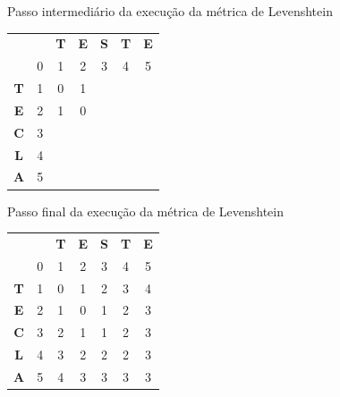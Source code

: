 \begin{quadro}[h!]
\caption{Passo intermediário da execução da métrica de Levenshtein}
\label{LevenshteinPasso2}
\centering
\begin{tabular}{cc|c|c|c|c|c|}
\textbf{}  & \textbf{} & \textbf{T} & \textbf{E} & \textbf{S} & \textbf{T} & \textbf{E} \\ 
\textbf{}  & 0         & 1          & 2          & 3          & 4          & 5          \\ \hline
\textbf{T} & 1         & 0          & 1          &           &           &           \\ \hline
\textbf{E} & 2         &     1       &      0      &            &            &            \\ \hline
\textbf{C} & 3         &            &            &            &            &            \\ \hline
\textbf{L} & 4         &            &            &            &            &            \\ \hline
\textbf{A} & 5         &            &            &            &            &            \\ \hline
\end{tabular}
\end{quadro}
\begin{quadro}[h]
\caption{Passo final da execução da métrica de Levenshtein}
\label{LevenshteinPasso3}
\centering
\begin{tabular}{cc|c|c|c|c|c|}
\textbf{}  & \textbf{} & \textbf{T} & \textbf{E} & \textbf{S} & \textbf{T} & \textbf{E} \\ 
\textbf{}  & 0         & 1          & 2          & 3          & 4          & 5          \\ \hline
\textbf{T} & 1         & 0          & 1          & 2          & 3          & 4          \\ \hline
\textbf{E} & 2         & 1          & 0          & 1          & 2          & 3          \\ \hline
\textbf{C} & 3         & 2          & 1          & 1          & 2          & 3          \\ \hline
\textbf{L} & 4         & 3          & 2          & 2          & 2          & 3          \\ \hline
\textbf{A} & 5         & 4          & 3          & 3          & 3          & 3          \\ \hline
\end{tabular}
\end{quadro}

